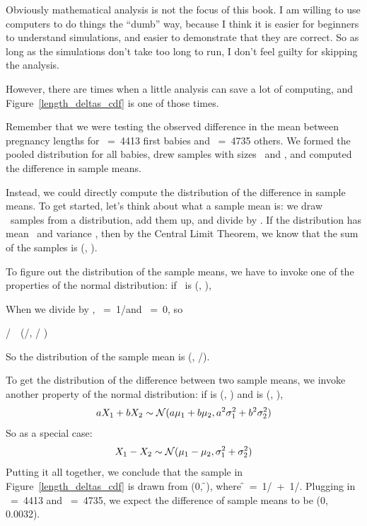 \documentclass[12pt]{book}
\begin{document}
Obviously mathematical analysis is not the focus of this book.  I am
willing to use computers to do things the ``dumb'' way, because I
think it is easier for beginners to understand simulations, and easier
to demonstrate that they are correct.  So as long as the simulations
don't take too long to run, I don't feel guilty for skipping the
analysis.

However, there are times when a little analysis can save a lot of
computing, and Figure~\ref{length_deltas_cdf} is one of those times.

Remember that we were testing the observed difference in the mean between
pregnancy lengths for \n~=~4413 first babies and \m~=~4735 others.  We formed
the pooled distribution for all babies, drew samples with sizes \n~and
\m, and computed the difference in sample means.

Instead, we could directly compute the distribution of the difference
in sample means.  To get started, let's think about what a sample mean
is: we draw \n~samples from a distribution, add them up, and
divide by \n.  If the distribution has mean \mymu~and variance
\sigmasq, then by the Central Limit Theorem, we know that the sum of
the samples is \mynormal (\n \mymu, \n \sigmasq).

To figure out the distribution of the sample means, we have to invoke
one of the properties of the normal distribution: if \X~is
\mynormal (\mymu, \sigmasq),


When we divide by \n, \mya~=~1/\n and \myb~=~0, so

\X/\n~\mysim~\mynormal(\mymu /\n, \sigmasq/ \n{})

So the distribution of the sample mean is \mynormal (\mymu, \sigmasq/\n).

To get the distribution of the difference between two sample means,
we invoke another property of the normal distribution: if \X{} is
\mynormal (\mymu{}, \mysigma{}) and \X{} is
\mynormal (\mymu{}, \mysigma{}),
%
\[ aX_1 + bX_2 \sim \mathcal{N} (a\mu_1 + b\mu_2, 
                                 a^2\sigma_1^2 + b^2\sigma_2^2) \]
%
So as a special case:
%
\[ X_1 - X_2 \sim \mathcal{N} (\mu_1 - \mu_2, 
                               \sigma_1^2 + \sigma_2^2) \]
%
Putting it all together, we conclude that the sample in
Figure~\ref{length_deltas_cdf} is drawn from 
\mynormal (0, \f \sigmasq), where \f~=~1/\n~+~1/\m.  Plugging in
\n~=~4413 and \m~=~4735, we expect the difference of sample means to be
\mynormal (0, 0.0032).
\end{document}
